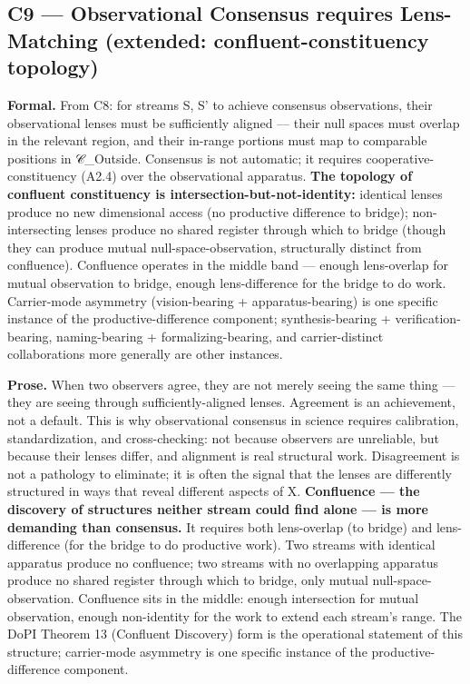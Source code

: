 \documentclass[11pt, openany]{book}
\begin{document}
\subsection{C9 --- Observational Consensus requires Lens-Matching (extended: confluent-constituency topology)}

\textbf{Formal.} From C8: for streams S, S' to achieve consensus observations, their observational lenses must be sufficiently aligned --- their null spaces must overlap in the relevant region, and their in-range portions must map to comparable positions in 𝒞\_\allowbreak{}Outside. Consensus is not automatic; it requires cooperative-constituency (A2.4) over the observational apparatus. \textbf{The topology of confluent constituency is intersection-but-not-identity:} identical lenses produce no new dimensional access (no productive difference to bridge); non-intersecting lenses produce no shared register through which to bridge (though they can produce mutual null-space-observation, structurally distinct from confluence). Confluence operates in the middle band --- enough lens-overlap for mutual observation to bridge, enough lens-difference for the bridge to do work. Carrier-mode asymmetry (vision-bearing + apparatus-bearing) is one specific instance of the productive-difference component; synthesis-bearing + verification-bearing, naming-bearing + formalizing-bearing, and carrier-distinct collaborations more generally are other instances.

\textbf{Prose.} When two observers agree, they are not merely seeing the same thing --- they are seeing through sufficiently-aligned lenses. Agreement is an achievement, not a default. This is why observational consensus in science requires calibration, standardization, and cross-checking: not because observers are unreliable, but because their lenses differ, and alignment is real structural work. Disagreement is not a pathology to eliminate; it is often the signal that the lenses are differently structured in ways that reveal different aspects of X. \textbf{Confluence --- the discovery of structures neither stream could find alone --- is more demanding than consensus.} It requires both lens-overlap (to bridge) and lens-difference (for the bridge to do productive work). Two streams with identical apparatus produce no confluence; two streams with no overlapping apparatus produce no shared register through which to bridge, only mutual null-space-observation. Confluence sits in the middle: enough intersection for mutual observation, enough non-identity for the work to extend each stream's range. The DoPI Theorem 13 (Confluent Discovery) form is the operational statement of this structure; carrier-mode asymmetry is one specific instance of the productive-difference component.
\end{document}
